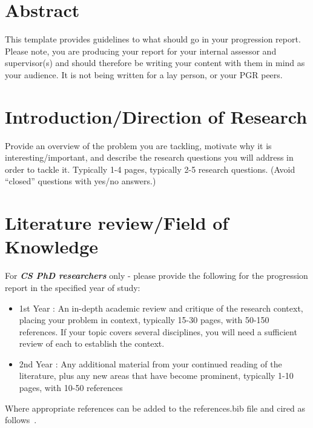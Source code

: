 \documentclass[11pt,a4paper]{article}
\begin{document}



\section*{Abstract}

This template provides guidelines to what should go in your progression report. Please note, you are producing your report for your internal assessor and supervisor(s) and should therefore be writing your content with them in mind as your audience. It is not being written for a lay person, or your PGR peers.

\tableofcontents
\newpage
\section{Introduction/Direction of Research}

Provide an overview of the problem you are tackling, motivate why it is interesting/important, and describe the research questions you will address in order to tackle it.  Typically 1-4 pages, typically 2-5 research questions.  (Avoid “closed” questions with yes/no answers.)

\section{Literature review/Field of Knowledge}
For \textbf{\emph{CS PhD researchers}} only - please provide the following for the progression report in the specified year of study:
\begin{itemize}
    \item 1st Year : An in-depth academic review and critique of the research context, placing your problem in context, typically 15-30 pages, with 50-150 references.  If your topic covers several disciplines, you will need a sufficient review of each to establish the context.
    \item 2nd Year : Any additional material from your continued reading of the literature, plus any new areas that have become prominent, typically 1-10 pages, with 10-50 references
\end{itemize}

Where appropriate references can be added to the references.bib file and cired as follows~\cite{Kelly_97}.
\end{document}
